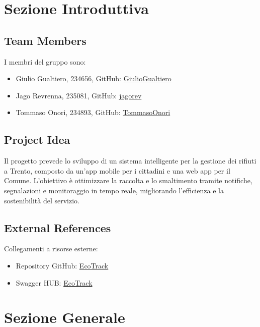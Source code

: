 \section{Sezione Introduttiva}

\subsection{Team Members}
I membri del gruppo sono:
\begin{itemize}
    \item Giulio Gualtiero, 234656, GitHub: \href{https://github.com/GiulioGualtiero}{GiulioGualtiero}
    \item Jago Revrenna, 235081, GitHub: \href{https://github.com/jagorev}{jagorev}
    \item Tommaso Onori, 234893, GitHub: \href{https://github.com/TommasoOnori}{TommasoOnori}
\end{itemize}

\subsection{Project Idea}
Il progetto prevede lo sviluppo di un sistema intelligente per la gestione dei rifiuti a Trento, composto da un'app mobile per i cittadini e una web app per il Comune. L'obiettivo è ottimizzare la raccolta e lo smaltimento tramite notifiche, segnalazioni e monitoraggio in tempo reale, migliorando l'efficienza e la sostenibilità del servizio.
\subsection{External References}
Collegamenti a risorse esterne:
\begin{itemize}
    \item Repository GitHub: \href{https://github.com/jagorev/EcoTrack}{EcoTrack}
    \item Swagger HUB: \href{ https://app.swaggerhub.com/apis-docs/universityoftrento/EcoTrackAPI/1.0.0#/}{EcoTrack}
\end{itemize}

\section{Sezione Generale}
